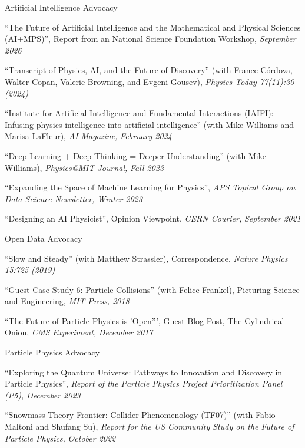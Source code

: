\item Artificial Intelligence Advocacy 
\bsbl 
\item ``The Future of Artificial Intelligence and the Mathematical and Physical Sciences (AI+MPS)'', Report from an National Science Foundation Workshop, \emph{September 2026}
\item ``Transcript of Physics, AI, and the Future of Discovery'' (with France Córdova, Walter Copan, Valerie Browning, and Evgeni Gousev), \emph{Physics Today 77(11):30 (2024)}
\item ``Institute for Artificial Intelligence and Fundamental Interactions (IAIFI): Infusing physics intelligence into artificial intelligence'' (with Mike Williams and Marisa LaFleur), \emph{AI Magazine,} \emph{February 2024}
\item ``Deep Learning + Deep Thinking = Deeper Understanding'' (with Mike Williams), \emph{Physics@MIT Journal,} \emph{Fall 2023}
\item ``Expanding the Space of Machine Learning for Physics'', \emph{APS Topical Group on Data Science Newsletter,} \emph{Winter 2023}
\item ``Designing an AI Physicist'', Opinion Viewpoint, \emph{CERN Courier,} \emph{September 2021}
\el 
\item Open Data Advocacy 
\bsbl 
\item ``Slow and Steady'' (with Matthew Strassler), Correspondence, \emph{Nature Physics 15:725 (2019)}
\item ``Guest Case Study 6:  Particle Collisions'' (with Felice Frankel), Picturing Science and Engineering, \emph{MIT Press,} \emph{2018}
\item ``The Future of Particle Physics is 'Open''', Guest Blog Post, The Cylindrical Onion, \emph{CMS Experiment,} \emph{December 2017}
\el 
\item Particle Physics Advocacy 
\bsbl 
\item ``Exploring the Quantum Universe: Pathways to Innovation and Discovery in Particle Physics'', \emph{Report of the Particle Physics Project Prioritization Panel (P5),} \emph{December 2023}
\item ``Snowmass Theory Frontier:  Collider Phenomenology (TF07)'' (with Fabio Maltoni and Shufang Su), \emph{Report for the US Community Study on the Future of Particle Physics,} \emph{October 2022}
\el 
